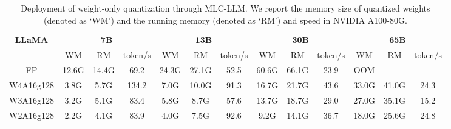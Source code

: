 \documentclass{article} %
\begin{document}
\begin{table}[!t]
    \centering
    \renewcommand{\arraystretch}{0.7}
    \setlength{\tabcolsep}{1pt}
    \caption{Deployment of weight-only quantization through MLC-LLM. We report the memory size of quantized weights (denoted as `WM') and the running memory (denoted as `RM') and speed in NVIDIA A100-80G. }
    \begin{tabular}{ccccccccccccc}
    \hline
    \textbf{LLaMA} & \multicolumn{3}{c}{\textbf{7B}} & \multicolumn{3}{c}{\textbf{13B}} & \multicolumn{3}{c}{\textbf{30B}} & \multicolumn{3}{c}{\textbf{65B}} \\
    \cmidrule(l{2pt}r{2pt}){2-4}
    \cmidrule(l{2pt}r{2pt}){5-7}
    \cmidrule(l{2pt}r{2pt}){8-10}
    \cmidrule(l{2pt}r{2pt}){11-13}
     & WM & RM &  token/s & WM & RM &  token/s  & WM & RM &  token/s  & WM & RM &  token/s \\
     \hline
    FP & 12.6G &	14.4G&	69.2&	24.3G &	27.1G &	52.5 &	60.6G&	66.1G	&23.9	&OOM&	-&	-\\
    W4A16g128 & 3.8G&	5.7G&	134.2&	7.0G&	10.0G&	91.3&	16.7G&	21.7G&	43.6&	33.0G&	41.0G&	24.3\\
    W3A16g128 &3.2G	&5.1G&	83.4&	5.8G&	8.7G&	57.6&	13.7G&	18.7G&	29.0&	27.0G&	35.1G&	15.2\\
    W2A16g128& 2.2G&	4.1G&	83.9&	4.0G&	7.5G&	92.6&	9.2G&	14.1G&	36.7&	18.0G&	25.6G&	24.8\\
    \hline
    \end{tabular}
    \vspace{-1.5em}
    \label{tab:speed}
\end{table}






\end{document}
